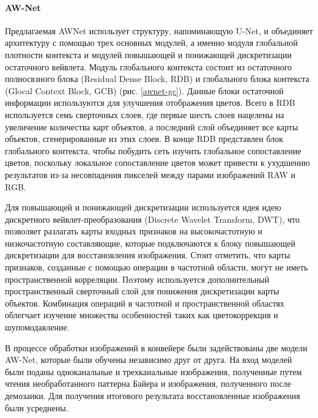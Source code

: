\paragraph{AW-Net}


Предлагаемая AWNet использует структуру, напоминающую U-Net, и объединяет архитектуру с помощью трех основных модулей, а именно модуля глобальной плотности контекста и модулей повышающей и понижающей дискретизации остаточного вейвлета. Модуль глобального контекста состоит из остаточного полносвзного блока (Residual Dense Block, RDB) и глобального блока контекста (Glocal Context Block, GCB) (рис. \ref{awnet-gc}). Данные блоки остаточной информации используются для улучшения отображения цветов. Всего в RDB используется семь сверточных слоев, где первые шесть слоев нацелены на увеличение количества карт объектов, а последний слой объединяет все карты объектов, сгенерированные из этих слоев. В конце RDB представлен блок глобального контекста, чтобы побудить сеть изучить глобальное сопоставление цветов, поскольку локальное сопоставление цветов может привести к ухудшению результатов из-за несовпадения пикселей между парами изображений RAW и RGB. 


Для повышающей и понижающей дискретизации используется идея идею дискретного вейвлет-преобразования (Discrete Wavelet Transform, DWT), что позволяет разлагать карты входных признаков на высокочастотную и низкочастотную составляющие, которые подключаются к блоку повышающей дискретизации для восстановления изображения. Стоит отметить, что карты признаков, созданные с помощью операции в частотной области, могут не иметь пространственной корреляции. Поэтому используется дополнительный пространственный сверточный слой для понижения дискретизации карты объектов. Комбинация операций в частотной и пространственной областях облегчает изучение множества особенностей таких как цветокоррекция и шупомодавление.

В процессе обработки изображений в конвейере были задействованы две модели AW-Net, которые были обучены независимо друг от друга. На вход моделей были поданы одноканальные и трехканальные изображения, полученные путем чтения необработанного паттерна Байера и изображения, полученного после демозаики. Для получения итогового результата восстановленные изображения были усреднены.
